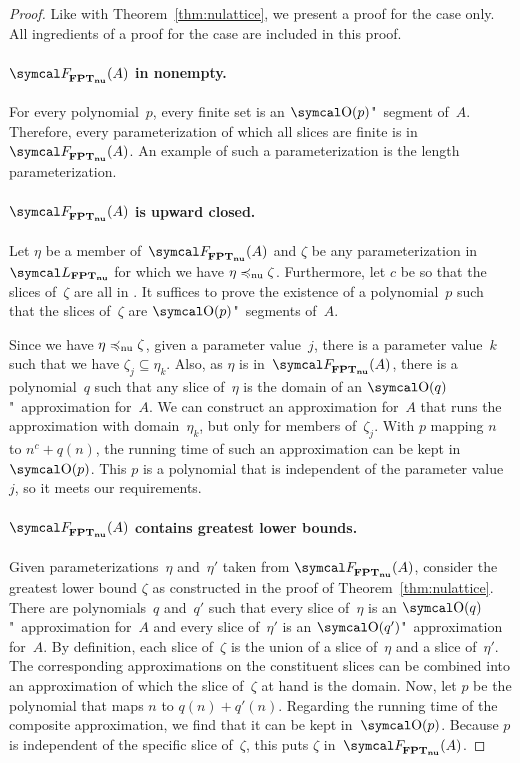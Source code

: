 \begin{proof}
  Like with Theorem~\ref{thm:nulattice}, we present a proof for the  case only.
  All ingredients of a proof for the  case are included in this proof.

  \paragraph{$\calF_\clnu{FPT}(A)$ in nonempty.}
  For every polynomial~$p$, every finite set is an $\bigO(p)$"~segment of~$A$.
  Therefore, every parameterization of which all slices are finite is in~$\calF_\clnu{FPT}(A)$.
  An example of such a parameterization is the length parameterization.

  \paragraph{$\calF_\clnu{FPT}(A)$ is upward closed.}
  Let $\eta$ be a member of~$\calF_\clnu{FPT}(A)$ and $\zeta$ be any parameterization in~$\calL_\clnu{FPT}$ for which we have $\eta \preccurlyeq_\mathrm{nu} \zeta$.
  Furthermore, let $c$ be so that the slices of~$\zeta$ are all in .
  It suffices to prove the existence of a polynomial~$p$ such that the slices of~$\zeta$ are $\bigO(p)$"~segments of~$A$.

  Since we have $\eta \preccurlyeq_\mathrm{nu} \zeta$, given a parameter value~$j$, there is a parameter value~$k$ such that we have $\zeta_j \subseteq \eta_k$.
  Also, as $\eta$ is in~$\calF_\clnu{FPT}(A)$, there is a polynomial~$q$ such that any slice of~$\eta$ is the domain of an $\bigO(q)$"~approximation for~$A$.
  We can construct an approximation for~$A$ that runs the approximation with domain~$\eta_k$, but only for members of~$\zeta_j$.
  With $p$ mapping $n$ to $n^c + q(n)$, the running time of such an approximation can be kept in~$\bigO(p)$.
  This $p$ is a polynomial that is independent of the parameter value~$j$, so it meets our requirements.

  \paragraph{$\calF_\clnu{FPT}(A)$ contains greatest lower bounds.}
  Given parameterizations~$\eta$ and~$\eta'$ taken from $\calF_\clnu{FPT}(A)$, consider the greatest lower bound $\zeta$ as constructed in the proof of Theorem~\ref{thm:nulattice}.
  There are polynomials~$q$ and~$q'$ such that every slice of~$\eta$ is an $\bigO(q)$"~approximation for~$A$ and every slice of~$\eta'$ is an $\bigO(q')$"~approximation for~$A$.
  By definition, each slice of~$\zeta$ is the union of a slice of~$\eta$ and a slice of~$\eta'$.
  The corresponding approximations on the constituent slices can be combined into an approximation of which the slice of~$\zeta$ at hand is the domain.
  Now, let $p$ be the polynomial that maps $n$ to $q(n) + q'(n)$.
  Regarding the running time of the composite approximation, we find that it can be kept in~$\bigO(p)$.
  Because $p$ is independent of the specific slice of~$\zeta$, this puts $\zeta$ in~$\calF_\clnu{FPT}(A)$.
\end{proof}

